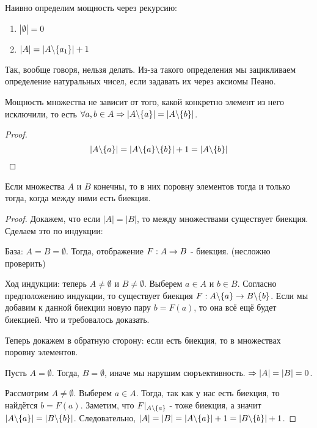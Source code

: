 \begin{definition}
	Наивно определим мощность через рекурсию:
	\begin{enumerate}
		\item $|\emptyset| = 0$
		\item $|A| = |A \backslash \{a_1\}| + 1$
	\end{enumerate}
\end{definition}

\begin{note}
	Так, вообще говоря, нельзя делать. Из-за такого определения мы зацикливаем определение натуральных чисел, если задавать их через аксиомы Пеано.
\end{note}

\begin{theorem}
	Мощность множества не зависит от того, какой конкретно элемент из него исключили, то есть $\forall a, b \in A \Rightarrow |A \backslash \{a\}| = |A \backslash \{b\}|$.
\end{theorem}

\begin{proof}
	$$
		|A \backslash \{a\}| = |A \backslash \{a\} \backslash \{b\}| + 1 = |A \backslash \{b\}|
	$$
\end{proof}

\begin{theorem}
	Если множества $A$ и $B$ конечны, то в них поровну элементов тогда и только тогда, когда между ними есть биекция.
\end{theorem}

\begin{proof}
	Докажем, что если $|A| = |B|$, то между множествами существует биекция. Сделаем это по индукции:
	
	База: $A = B = \emptyset$. Тогда, отображение $F : A \rightarrow B$ - биекция. (несложно проверить)
	
	Ход индукции: теперь $A \neq \emptyset$ и $B \neq \emptyset$. Выберем $a \in A$ и $b \in B$. Согласно предположению индукции, то существует биекция $F : A \backslash \{a\} \rightarrow B \backslash \{b\}$. Если мы добавим к данной биекции новую пару $b = F(a)$, то она всё ещё будет биекцией. Что и требовалось доказать.
	
	Теперь докажем в обратную сторону: если есть биекция, то в множествах поровну элементов.
	
	Пусть $A = \emptyset$. Тогда, $B = \emptyset$, иначе мы нарушим сюръективность. $\Rightarrow |A| = |B| = 0$.
	
	Рассмотрим $A \neq \emptyset$. Выберем $a \in A$. Тогда, так как у нас есть биекция, то найдётся $b = F(a)$. Заметим, что $F|_{A \backslash \{a\}}$ - тоже биекция, а значит $|A \backslash \{a\}| = |B \backslash \{b\}|$. Следовательно, $|A| = |B| = |A \backslash \{a\}| + 1 = |B \backslash \{b\}| + 1$.
\end{proof}

